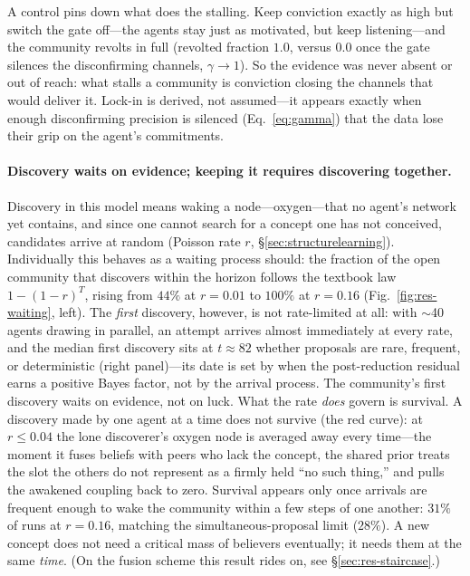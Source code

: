 \documentclass[11pt]{article}
\begin{document}
A control pins down what does the stalling. Keep conviction exactly as high but switch the gate
off---the agents stay just as motivated, but keep listening---and the community revolts in full
(revolted fraction $1.0$, versus $0.0$ once the gate silences the disconfirming channels,
$\gamma\to1$). So the evidence was never absent or out of reach: what stalls a community is
conviction closing the channels that would deliver it. Lock-in is derived, not assumed---it appears
exactly when enough disconfirming precision is silenced (Eq.~\ref{eq:gamma}) that the data lose
their grip on the agent's commitments.

\paragraph{Discovery waits on evidence; keeping it requires discovering together.}
Discovery in this model means waking a node---oxygen---that no agent's network yet contains, and
since one cannot search for a concept one has not conceived, candidates arrive at random (Poisson
rate $r$, \S\ref{sec:structurelearning}). Individually this behaves as a waiting process should:
the fraction of the open community that discovers within the horizon follows the textbook law
$1-(1-r)^T$, rising from $44\%$ at $r=0.01$ to $100\%$ at $r=0.16$ (Fig.~\ref{fig:res-waiting},
left). The \emph{first} discovery, however, is not rate-limited at all: with $\sim$40 agents
drawing in parallel, an attempt arrives almost immediately at every rate, and the median first
discovery sits at $t\approx82$ whether proposals are rare, frequent, or deterministic (right
panel)---its date is set by when the post-reduction residual earns a positive Bayes factor, not by
the arrival process. The community's first discovery waits on evidence, not on luck. What the rate
\emph{does} govern is survival. A discovery made by one agent at a time does not survive (the red
curve): at $r\le0.04$ the lone discoverer's oxygen node is averaged away every time---the moment it
fuses beliefs with peers who lack the concept, the shared prior treats the slot the others do not
represent as a firmly held ``no such thing,'' and pulls the awakened coupling back to zero.
Survival appears only once arrivals are frequent enough to wake the community within a few steps of
one another: $31\%$ of runs at $r=0.16$, matching the simultaneous-proposal limit ($28\%$). A new
concept does not need a critical mass of believers eventually; it needs them at the same
\emph{time}. (On the fusion scheme this result rides on, see \S\ref{sec:res-staircase}.)
\end{document}
